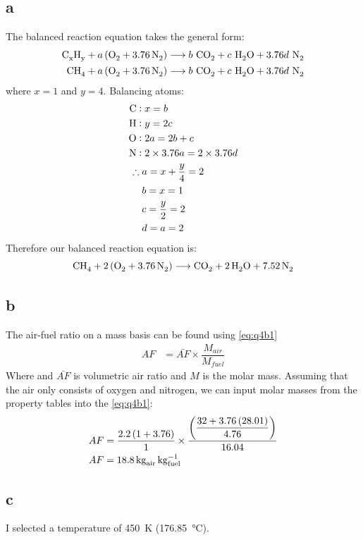 \documentclass[11pt]{article}
\numberwithin{equation}{section}
\begin{document}
\subsection{a}
The balanced reaction equation takes the general form:
\begin{align}
    \ce{C_x H_y} + a \left(\ce{O2} + \ce{3.76N2}\right)&\longrightarrow b \ \ce{CO2} + c \ \ce{H2O} + 3.76 d \ \ce{N2}\\
    \ce{C H4} + a \left(\ce{O2} + \ce{3.76N2}\right)&\longrightarrow b \ \ce{CO2} + c \ \ce{H2O} + 3.76 d \ \ce{N2}
\end{align}
where $x = 1$ and $y= 4$. Balancing atoms:
\begin{align}
    \ce{C}:& \; x = b\\
    \ce{H}:& \; y = 2c\\
    \ce{O}:& \; 2a = 2b + c\\
    \ce{N}:& \; 2\times 3.76 a = 2\times 3.76 d\\
    \therefore \; &a = x + \frac{y}{4} = 2\\
    &b = x = 1\\
    &c = \frac{y}{2} = 2\\
    &d = a = 2
\end{align}
Therefore our balanced reaction equation is:
\begin{equation}
    \ce{CH4} + 2\left(\ce{O2} + \ce{3.76N2}\right)\longrightarrow \ce{CO2} + \ce{2H2O} + \ce{7.52N2}
\end{equation}
\subsection{b}
The air-fuel ratio on a mass basis can be found using \ref{eq:q4b1}
\begin{align}
    AF &= \bar{AF} \times \dfrac{M_{air}}{M_{fuel}} \label{eq:q4b1}
\end{align}
Where and $\bar{AF}$ is volumetric air ratio and $M$ is the molar mass. Assuming that the air only consists of oxygen and nitrogen, we can input molar masses from the property tables into the \ref{eq:q4b1}:
\begin{align}
    AF &= \dfrac{2.2\left(1 + 3.76\right)}{1} \times  \dfrac{\left(\dfrac{32+3.76\left(28.01\right)}{4.76}\right)}{16.04}\\
    AF &= \SI{18.8}{\kg\of{air}\per\kg\of{fuel}}
\end{align}
\subsection{c}
I selected a temperature of \SI{450}{\kelvin} (\SI{176.85}{\celsius}).
\end{document}
